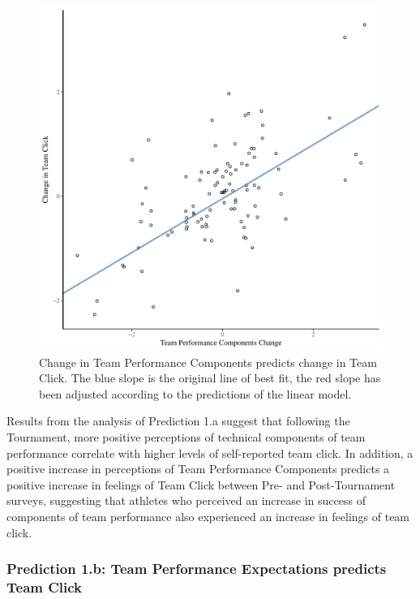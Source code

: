\begin{CJK}{UTF8}{gbsn}


\begin{figure}[htbp]
  \centering
\includegraphics[scale=.5]{images/jasClickDeltaModelSlope}
  \caption{Change in Team Performance Components predicts change in Team Click. The blue slope is the original line of best fit, the red slope has been adjusted according to the predictions of the linear model.}
  \label{fig:jasClickDeltaModelSLope}
\end{figure}

Results from the analysis of Prediction 1.a suggest that following the Tournament, more positive perceptions of technical components of team performance correlate with higher levels of self-reported team click.  In addition, a positive increase in perceptions of Team Performance Components predicts a positive increase in feelings of Team Click between Pre- and Post-Tournament surveys, suggesting that athletes who perceived an increase in success of components of team performance also experienced an increase in feelings of team click.






\subsubsection{Prediction 1.b: Team Performance Expectations predicts Team Click}


\end{CJK}
